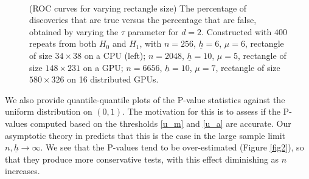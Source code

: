 \documentclass[twoside,11pt]{article}
\begin{document}
\begin{figure}[!htbp]
\centering
\mbox{
}
\caption{{\small (ROC curves for varying rectangle size) The percentage of discoveries that are true versus the percentage that are false, obtained by varying the $\tau$ parameter for $d=2$.  Constructed with $400$ repeats from both $H_0$ and $H_1$, with $n = 256$, $\underline h = 6$, $\mu = 6$, rectangle of size $34 \times 38$ on a CPU (left); $n=2048$, $\underline h = 10$, $\mu = 5$, rectangle of size $148 \times 231$ on a GPU; $n=6656$, $\underline h = 10$, $\mu = 7$, rectangle of size $580 \times 326$ on 16 distributed GPUs.}
}
\label{fig1}
\end{figure}

We also provide quantile-quantile plots of the P-value statistics against the uniform distribution on $(0,1)$.
The motivation for this is to assess if the P-values computed based on the thresholds \eqref{u_m} and \eqref{u_a} are accurate.
Our asymptotic theory in  predicts that this is the case in the large sample limit $n, \underline h \to \infty$.
We see that the P-values tend to be over-estimated (Figure \ref{fig2}), so that they produce more conservative tests, with this effect diminishing as $n$ increases.
\end{document}
